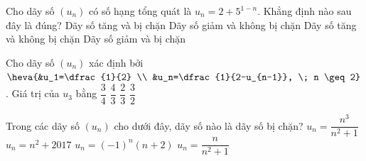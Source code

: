 \begin{ex}%
	Cho  dãy số $(u_n)$ có số hạng tổng quát là $u_n = 2 + 5^{1-n}$. Khẳng định nào sau đây là đúng?
	\choice 
		{Dãy số tăng và bị  chặn}
		{Dãy  số giảm và không bị chặn}
		{Dãy số tăng và không bị chặn} 
		{\True Dãy số giảm  và bị chặn}
\end{ex}

\begin{ex}%
	Cho dãy số $(u_n)$ xác định bởi 
	$\heva{&u_1=\dfrac{1}{2}  \\
	&u_n=\dfrac{1}{2-u_{n-1}}, \; n \geq  2}$. Giá trị của $u_3$ bằng
	\choice 
		{\True $\dfrac{3}{4}$} 
		{$\dfrac{4}{3}$} 
		{$\dfrac{2}{3}$} 
		 {$\dfrac{3}{2}$}
\end{ex}

\begin{ex}%
	Trong các dãy số $(u_n)$ cho dưới đây, dãy số nào là dãy số bị chặn? 
	\choice 
		{$u_n = \dfrac{n^3}{n^2  + 1}$}
		{$u_n = n^2  + 2017$}
		{$u_n =  (-1)^n(n+2)$}
		 {\True $u_n = \dfrac{n}{n^2 + 1}$}
\end{ex}

